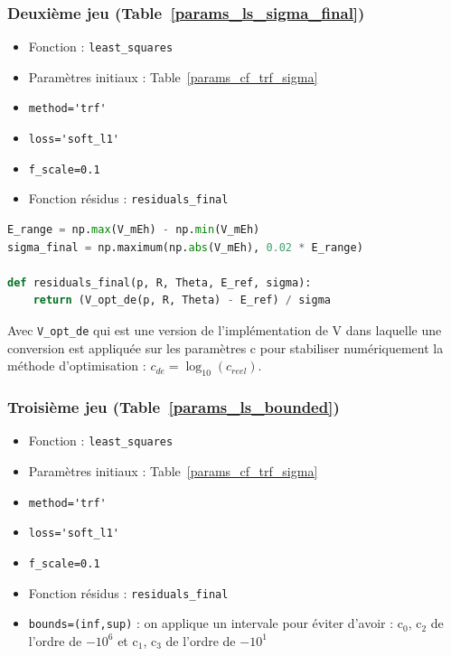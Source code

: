 \documentclass[10pt,a4paper]{article}
\begin{document}
\subsubsection{Deuxième jeu (Table~\ref{params_ls_sigma_final})}

\begin{itemize}
  \item Fonction : \verb|least_squares|
  \item Paramètres initiaux : Table~\ref{params_cf_trf_sigma}
  \item \verb|method='trf'|
  \item \verb|loss='soft_l1'|
  \item \verb|f_scale=0.1|
  \item Fonction résidus : \verb|residuals_final|
\end{itemize}

\begin{lstlisting}[language=Python, caption={Fonction résidus}, label={lst:residuals_final}]
E_range = np.max(V_mEh) - np.min(V_mEh)
sigma_final = np.maximum(np.abs(V_mEh), 0.02 * E_range)

def residuals_final(p, R, Theta, E_ref, sigma):
    return (V_opt_de(p, R, Theta) - E_ref) / sigma
\end{lstlisting}

Avec \verb|V_opt_de| qui est une version de l'implémentation de V dans laquelle
une conversion est appliquée sur les paramètres c pour stabiliser numériquement
la méthode d'optimisation : $c_{de}=\log_{10}(c_{reel})$.

\subsubsection{Troisième jeu (Table~\ref{params_ls_bounded})}

\begin{itemize}
  \item Fonction : \verb|least_squares|
  \item Paramètres initiaux : Table~\ref{params_cf_trf_sigma}
  \item \verb|method='trf'|
  \item \verb|loss='soft_l1'|
  \item \verb|f_scale=0.1|
  \item Fonction résidus : \verb|residuals_final|
  \item \verb|bounds=(inf,sup)| : on applique un intervale pour éviter d'avoir :
    c$_{0}$, c$_{2}$ de l'ordre de $-10^6$ et c$_{1}$, c$_{3}$ de l'ordre de $-10^1$
\end{itemize}
\end{document}
